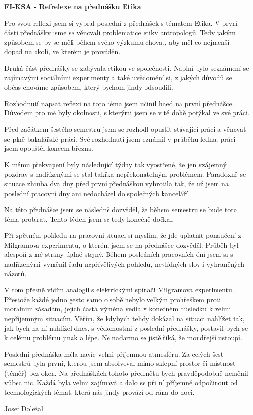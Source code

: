 \documentclass[11pt,a4paper,czech]{article}
\newcommand{\heading}[1]{
    \begin{center}
    {\bf\large #1}\par
    \bigskip
    \end{center}
}
\begin{document}
\heading{FI-KSA - Refrelexe na přednášku Etika}

Pro svou reflexi jsem si vybral poslední z přednášek s tématem Etika.
V první části přednášky jsme se věnovali problematice etiky antropologů.
Tedy jakým způsobem se by se měli během svého výzkumu chovat, aby měl co nejmenší dopad na okolí, ve kterém je prováděn.

Druhá část přednášky se zabývala etikou ve společnosti.
Náplní bylo seznámení se zajímavými sociálními experimenty a také uvědomění si, z jakých důvodů se občas chováme způsobem, který bychom jindy odsoudili.

\medskip

Rozhodnutí napsat reflexi na toto téma jsem učinil hned na první přednášce.
Důvodem pro mě byly okolnosti, s kterými jsem se v té době potýkal ve své práci.

Před začátkem šestého semestru jsem se rozhodl opustit stávající práci a věnovat se plně bakalářské práci.
Své rozhodnutí jsem oznámil v průběhu ledna, práci jsem opouštěl koncem března.

K mému překvapení byly následující týdny tak vyostřené, že jen vzájemný pozdrav s nadřízenými se stal takřka nepřekonatelným problémem.
Paradoxně se situace zhruba dva dny před první přednáškou vyhrotila tak, že už jsem na poslední pracovní dny ani nedocházel do společných kanceláří.

Na této přednášce jsem se následně dozvěděl, že během semestru se bude toto téma probírat.
Tento týden jsem se tedy konečně dočkal.

Při zpětném pohledu na pracovní situaci si myslím, že jde uplatnit ponaučení z Milgramova experimentu, o kterém jsem se na přednášce dozvěděl.
Průběh byl alespoň z mé strany úplně stejný.
Během posledních pracovních dní jsem si s nadřízenými vyměnil řadu nepřívětivých pohledů, nevlídných slov i vyhraněných názorů.

V tom přesně vidím analogii s elektrickými spínači Milgramova experimentu.
Přestože každé jedno gesto samo o sobě nebylo velkým prohřeškem proti morálním zásadám, jejich častá výměna vedla v konečném důsledku k velmi nepříjemným situacím.
Věřím, že kdybych tehdy dokázal na situaci nahlížet tak, jak bych na ní nahlížel dnes, s vědomostmi z poslední přednášky, postavil bych se k celému problému jinak a lépe.
Ne nadarmo se jistě říká, že moudřejší ustoupí.

\medskip

Poslední přednáška měla navíc velmi příjemnou atmosféru.
Za celých šest semestrů byla první, kterou jsem absolvoval mimo sklepní prostor či místnost (téměř) bez oken.
Na přednáškách tohoto předmětu bych pravděpodobně neměnil vůbec nic.
Každá byla velmi zajímavá a dalo se při ní příjemně odpočinout od technologických témat, která nás jindy provází od rána do noci.

\vspace{1.5cm}
\hfill{}Josef Doležal
\thispagestyle{empty}
\end{document}
